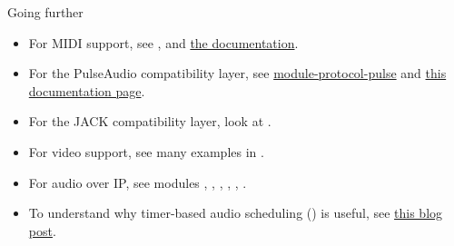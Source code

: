 \begin{frame}{Going further}
  \begin{itemize}

  \item For MIDI support, see , 
    and \href{https://docs.pipewire.org/page_midi.html}{the documentation}.

  \item For the PulseAudio compatibility layer, see
    \href{https://docs.pipewire.org/page_module_protocol_pulse.html
    }{module-protocol-pulse} and \href{
      https://docs.pipewire.org/page_pulseaudio.html}{this documentation page}.

  \item For the JACK compatibility layer, look at .

  \item For video support, see many examples in .

  \item For audio over IP, see modules , ,
    , , , .

  \item To understand why timer-based audio scheduling () is
    useful, see \href{https://0pointer.net/blog/projects/pulse-glitch-free.html
    }{this blog post}.

  \end{itemize}
\end{frame}

